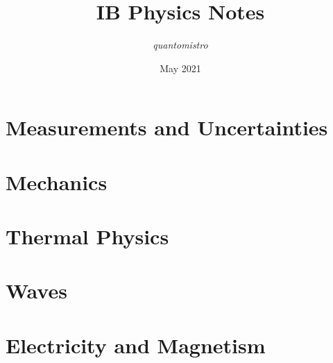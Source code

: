 \documentclass{article}
\title{\Large \textbf{IB Physics Notes}}
\author{\textit{quantomistro}}
\date{May 2021}
\begin{document}
\begin{titlepage}
    \maketitle
\end{titlepage}

\begin{center}
    \tableofcontents
\end{center}

\newpage
\section{Measurements and Uncertainties}



\newpage
\section{Mechanics}



\newpage
\section{Thermal Physics}



\newpage
\section{Waves}



\newpage
\section{Electricity and Magnetism}



\newpage
\end{document}
